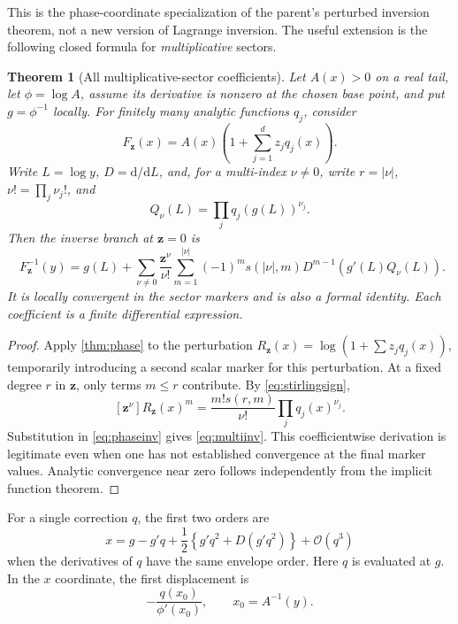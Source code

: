 \documentclass[11pt,a4paper]{article}
\newtheorem{theorem}{Theorem}[section]
\theoremstyle{definition}
\theoremstyle{remark}
\newcommand{\dd}{\mathrm d}
\newcommand{\OO}{\mathcal O}
\newcommand{\coef}[1]{\left[#1\right]}
\numberwithin{equation}{section}
\begin{document}
This is the phase-coordinate specialization of the parent's perturbed inversion theorem, not a new version of Lagrange inversion. The useful extension is the following closed formula for \emph{multiplicative} sectors.

\begin{theorem}[All multiplicative-sector coefficients]
\label{thm:multi}
Let $A(x)>0$ on a real tail, let $\phi=\log A$, assume its derivative is nonzero at the chosen base point, and put $g=\phi^{-1}$ locally. For finitely many analytic functions $q_j$, consider
\begin{equation}
 F_{\bm z}(x)=A(x)\left(1+\sum_{j=1}^d z_jq_j(x)\right).
 \label{eq:multifamily}
\end{equation}
Write $L=\log y$, $D=\dd/\dd L$, and, for a multi-index $\nu\ne0$, write $r=|\nu|$, $\nu!=\prod_j\nu_j!$, and
\[
 Q_\nu(L)=\prod_j q_j(g(L))^{\nu_j}.
\]
Then the inverse branch at $\bm z=0$ is
\begin{equation}
 \boxed{\quad
 F_{\bm z}^{-1}(y)=g(L)+
 \sum_{\nu\ne0}\frac{\bm z^\nu}{\nu!}
 \sum_{m=1}^{|\nu|}(-1)^m s(|\nu|,m)
 D^{m-1}\!\left(g'(L)Q_\nu(L)\right).
 \quad}
 \label{eq:multiinv}
\end{equation}
It is locally convergent in the sector markers and is also a formal identity. Each coefficient is a finite differential expression.
\end{theorem}
\begin{proof}
Apply \cref{thm:phase} to the perturbation
$R_{\bm z}(x)=\log(1+\sum z_jq_j(x))$, temporarily introducing a second scalar marker for this perturbation. At a fixed degree $r$ in $\bm z$, only terms $m\le r$ contribute. By \eqref{eq:stirlingsign},
\[
 \coef{\bm z^\nu}R_{\bm z}(x)^m
 =\frac{m!s(r,m)}{\nu!}\prod_jq_j(x)^{\nu_j}.
\]
Substitution in \eqref{eq:phaseinv} gives \eqref{eq:multiinv}. This coefficientwise derivation is legitimate even when one has not established convergence at the final marker values. Analytic convergence near zero follows independently from the implicit function theorem.
\end{proof}

For a single correction $q$, the first two orders are
\begin{equation}
 x=g-g'q+\frac12\left\{g'q^2+D(g'q^2)\right\}+\OO(q^3)
 \label{eq:firstmulti}
\end{equation}
when the derivatives of $q$ have the same envelope order. Here $q$ is evaluated at $g$. In the $x$ coordinate, the first displacement is
\begin{equation}
 -\frac{q(x_0)}{\phi'(x_0)},\qquad x_0=A^{-1}(y).
 \label{eq:firstdisplacement}
\end{equation}
\end{document}
